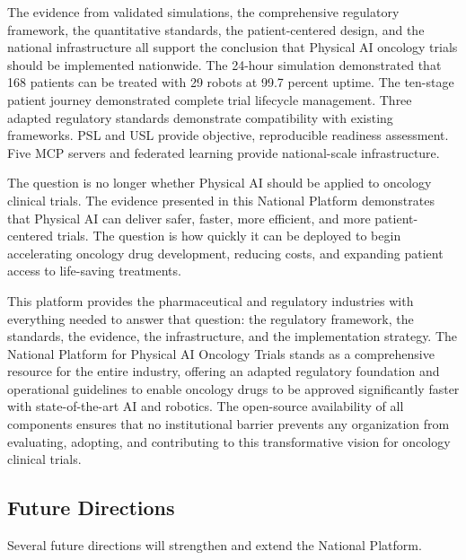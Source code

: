 The evidence from validated simulations, the comprehensive regulatory framework,
the quantitative standards, the patient-centered design, and the national
infrastructure all support the conclusion that Physical AI oncology trials
should be implemented nationwide. The 24-hour simulation demonstrated that 168
patients can be treated with 29 robots at 99.7 percent uptime. The ten-stage
patient journey demonstrated complete trial lifecycle management. Three adapted
regulatory standards demonstrate compatibility with existing frameworks. PSL and
USL provide objective, reproducible readiness assessment. Five MCP servers and
federated learning provide national-scale infrastructure.

The question is no longer whether Physical AI should be applied to oncology
clinical trials. The evidence presented in this National Platform demonstrates
that Physical AI can deliver safer, faster, more efficient, and more
patient-centered trials. The question is how quickly it can be deployed to begin
accelerating oncology drug development, reducing costs, and expanding patient
access to life-saving treatments.

This platform provides the pharmaceutical and regulatory industries with
everything needed to answer that question: the regulatory framework, the
standards, the evidence, the infrastructure, and the implementation strategy.
The National Platform for Physical AI Oncology Trials stands as a comprehensive
resource for the entire industry, offering an adapted regulatory foundation
and operational guidelines to enable oncology drugs to be approved significantly
faster with state-of-the-art AI and robotics. The open-source availability of
all components ensures that no institutional barrier prevents any organization
from evaluating, adopting, and contributing to this transformative vision for
oncology clinical trials.

\subsection{Future Directions}
\label{subsec:conclusion-future}

Several future directions will strengthen and extend the National Platform.

